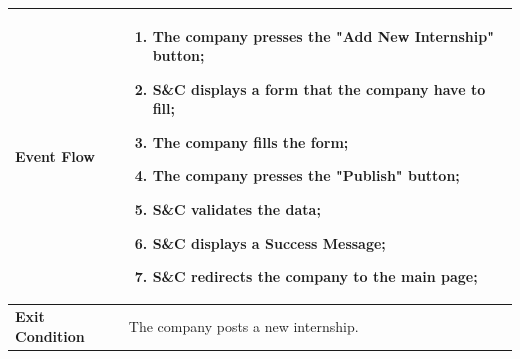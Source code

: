 \begin{enumerate}[label=\textbf{[US\arabic*]}, left = 0pt, align = left, resume]
\begin{longtable}{|l|p{11cm}|}
                \textbf{Event Flow} &
                    \begin{enumerate}[label=\arabic*., itemsep=0.2em]
                        \item The company presses the "Add New Internship" button;
                        \item S\&C displays a form that the company have to fill;
                        \item The company fills the form;
                        \item The company presses the "Publish" button;
                        \item S\&C validates the data;
                        \item S\&C displays a Success Message;
                        \item S\&C redirects the company to the main page;
                    \end{enumerate} \\
                \hline
                
                \textbf{Exit Condition} & 
                    The company posts a new internship. \\
                \hline
                

\end{longtable}
\end{enumerate}

